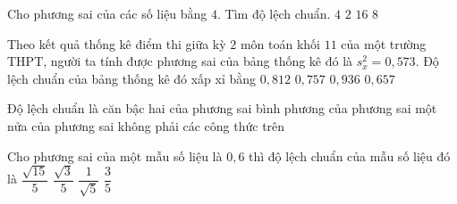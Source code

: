 

\begin{ex}%
	Cho phương sai của các số liệu bằng $4$. Tìm độ lệch  chuẩn.
	\choice 
		{$4$} 
		{\True  $2$}
		{$16$} 
		{$8$} 
\end{ex}

\begin{ex}%
	Theo kết quả thống kê điểm thi giữa kỳ $2$ môn toán khối $11$ của một trường THPT, người ta tính được phương sai của bảng thống kê đó là  $s_x^2=0{,}573$. Độ lệch chuẩn của bảng thống kê đó xấp xỉ bằng
	\choice 
		 {$0{,}812$}
		{\True  $0{,}757$}
		 {$0{,}936$}
		 {$0{,}657$}
\end{ex}

\begin{ex}%
	Độ  lệch chuẩn là
	\choice 
		{\True căn  bậc hai của phương sai}
		{bình  phương của phương sai}
		{một nửa của  phương sai}
		{không phải các công  thức trên}
\end{ex}

\begin{ex}%
	Cho phương sai của một mẫu số liệu là $0{,}6$ thì độ lệch chuẩn của mẫu  số liệu đó là
	 \choice
		{\True  $\dfrac{\sqrt{15}}{5}$}
		 {$\dfrac{\sqrt{3}}{5}$}
		{$\dfrac{1}{\sqrt{5}}$} 
		 {$\dfrac{3}{5}$}
\end{ex}

